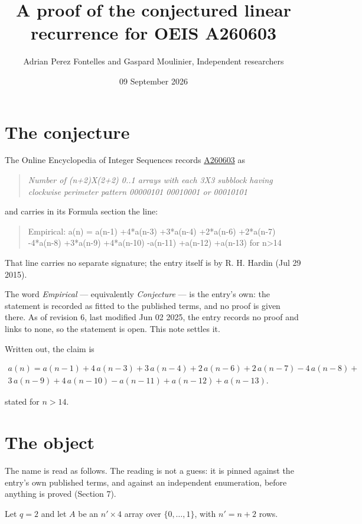 \documentclass[11pt]{article}
\title{A proof of the conjectured linear recurrence for OEIS A260603}
\author{Adrian Perez Fontelles and Gaspard Moulinier, Independent researchers}
\date{09 September 2026}
\theoremstyle{definition}
\begin{document}
\maketitle
\section{The conjecture}

The Online Encyclopedia of Integer Sequences records \href{https://oeis.org/A260603}{A260603} as

\begin{quote}\itshape Number of (n+2)X(2+2) 0..1 arrays with each 3X3 subblock having clockwise perimeter pattern 00000101 00010001 or 00010101\end{quote}

and carries in its Formula section the line:

\begin{quote}\ttfamily Empirical: a(n) = a(n-1) +4*a(n-3) +3*a(n-4) +2*a(n-6) +2*a(n-7) -4*a(n-8) +3*a(n-9) +4*a(n-10) -a(n-11) +a(n-12) +a(n-13) for n>14\end{quote}

That line carries no separate signature; the entry itself is by R. H. Hardin (Jul 29 2015).

The word {\itshape Empirical} --- equivalently {\itshape Conjecture} --- is the entry's own: the statement is recorded as fitted to the published terms, and no proof is given there. As of revision 6, last modified Jun 02 2025, the entry records no proof and links to none, so the statement is open. This note settles it.

Written out, the claim is

\begin{multline*} a(n) = a(n-1) + 4\,a(n-3) + 3\,a(n-4) + 2\,a(n-6) + 2\,a(n-7) - 4\,a(n-8) + \\ 3\,a(n-9) + 4\,a(n-10) - a(n-11) + a(n-12) + a(n-13). \end{multline*}

stated for $n > 14$.

\section{The object}

The name is read as follows. The reading is not a guess: it is pinned against the entry's own published terms, and against an independent enumeration, before anything is proved (Section 7).

Let $q = 2$ and let $A$ be an $n' \times 4$ array over $\{0,\dots,1\}$, with $n' = n + 2$ rows.
\end{document}
